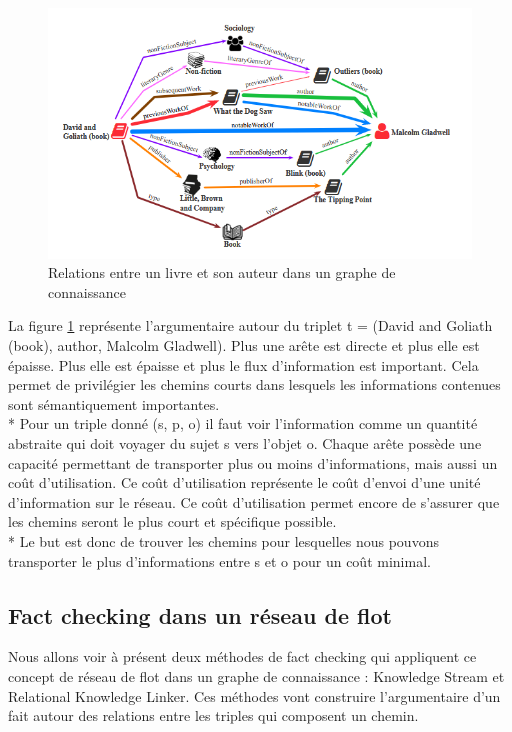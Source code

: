 \begin{figure}[H]
\centering
\includegraphics[width=\textwidth, draft=false]{imgs/bookAuthorKG.PNG}
\caption{Relations entre un livre et son auteur dans un graphe de connaissance \cite{shiralkar2017finding}}
\label{stream}
\end{figure}

La figure \ref{stream} représente l'argumentaire autour du triplet t = (David and Goliath (book), author, Malcolm Gladwell). Plus une arête est directe et plus elle est épaisse. Plus elle est épaisse et plus le flux d'information est important. Cela permet de privilégier les chemins courts dans lesquels les informations contenues sont sémantiquement importantes. 
\\*
Pour un triple donné (s, p, o) il faut voir l'information comme un quantité abstraite qui doit voyager du sujet s vers l'objet o. Chaque arête possède une capacité permettant de transporter plus ou moins d'informations, mais aussi un coût d'utilisation. Ce coût d'utilisation représente le coût d'envoi d'une unité d'information sur le réseau. Ce coût d'utilisation permet encore de s'assurer que les chemins seront le plus court et spécifique possible.
\\*
Le but est donc de trouver les chemins pour lesquelles nous pouvons transporter le plus d'informations entre s et o pour un coût minimal.

\subsection{Fact checking dans un réseau de flot}

Nous allons voir à présent deux méthodes de fact checking qui appliquent ce concept de réseau de flot dans un graphe de connaissance : Knowledge Stream et Relational Knowledge Linker. Ces méthodes vont construire l'argumentaire d'un fait autour des relations entre les triples qui composent un chemin.


